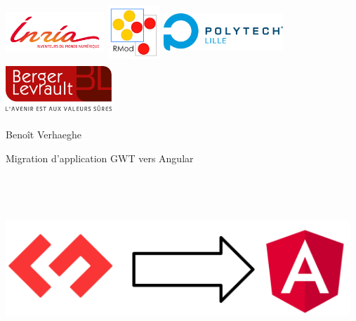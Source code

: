 \documentclass[11pt,]{article}
\author{Benoît Verhaeghe}
\date{}
\begin{document}
\renewcommand{\tablename}{Tableau}
\begin{titlepage}

\includegraphics[width=3.7cm, height=2cm]{logo/inria.png}
\includegraphics[width=2cm, height=2cm]{logo/rmod.png}
\includegraphics[width=4.5cm, height=2cm]{logo/polytech.jpg}
\hfill
\includegraphics[width=4cm, height=2cm]{logo/BL_logo.jpg}
\begin{center}

\vspace*{2.5cm}

\Large Benoît Verhaeghe

\vspace{1.5cm}

\Huge Migration d'application GWT vers Angular

\vspace{2.5cm}

\includegraphics[width=13cm, height=7cm]{figures/intro.png}


\end{center}
\end{titlepage}
\end{document}
